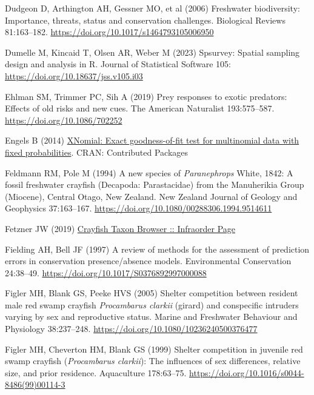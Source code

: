\documentclass[
  12pt,
  a4paper,
  oneside]{scrbook}
\newlength{\cslhangindent}
\newenvironment{CSLReferences}[2] %
 {\begin{list}{}{%
  \setlength{\itemindent}{0pt}
  \setlength{\leftmargin}{0pt}
  \setlength{\parsep}{0pt}
  \ifodd #1
   \setlength{\leftmargin}{\cslhangindent}
   \setlength{\itemindent}{-1\cslhangindent}
  \fi
  \setlength{\itemsep}{#2\baselineskip}}}
 {\end{list}}
\begin{document}
\begin{CSLReferences}{1}{1}
Dudgeon D, Arthington AH, Gessner MO, et al (2006) Freshwater
biodiversity: Importance, threats, status and conservation challenges.
Biological Reviews 81:163--182.
\url{https://doi.org/10.1017/s1464793105006950}

Dumelle M, Kincaid T, Olsen AR, Weber M (2023) Spsurvey: Spatial
sampling design and analysis in {R}. Journal of Statistical Software
105: \url{https://doi.org/10.18637/jss.v105.i03}

Ehlman SM, Trimmer PC, Sih A (2019) Prey responses to exotic predators:
Effects of old risks and new cues. The American Naturalist 193:575--587.
\url{https://doi.org/10.1086/702252}

Engels B (2014)
\href{https://doi.org/10.32614/cran.package.xnomial}{{XNomial}: Exact
goodness-of-fit test for multinomial data with fixed probabilities}.
CRAN: Contributed Packages

Feldmann RM, Pole M (1994) A new species of {\emph{Paranephrops}}
{White}, 1842: A fossil freshwater crayfish ({Decapoda}: {Parastacidae})
from the {Manuherikia Group} ({Miocene}), {Central Otago}, {New
Zealand}. New Zealand Journal of Geology and Geophysics 37:163--167.
\url{https://doi.org/10.1080/00288306.1994.9514611}

Fetzner JW (2019)
\href{https://www.invertebratezoology.org/NewAstacidea/infraorder.asp?io=Astacidea}{Crayfish
{Taxon Browser :: Infraorder Page}}

Fielding AH, Bell JF (1997) A review of methods for the assessment of
prediction errors in conservation presence/absence models. Environmental
Conservation 24:38--49. \url{https://doi.org/10.1017/S0376892997000088}

Figler MH, Blank GS, Peeke HVS (2005) Shelter competition between
resident male red swamp crayfish {\emph{Procambarus clarkii}} (girard)
and conspecific intruders varying by sex and reproductive status. Marine
and Freshwater Behaviour and Physiology 38:237--248.
\url{https://doi.org/10.1080/10236240500376477}

Figler MH, Cheverton HM, Blank GS (1999) Shelter competition in juvenile
red swamp crayfish ({\emph{Procambarus clarkii}}): The influences of sex
differences, relative size, and prior residence. Aquaculture 178:63--75.
\url{https://doi.org/10.1016/s0044-8486(99)00114-3}


\end{CSLReferences}
\end{document}
